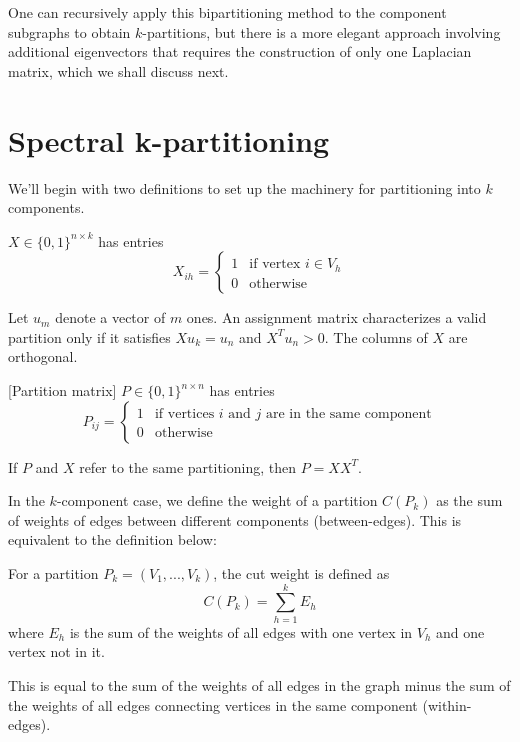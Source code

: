 One can recursively apply this bipartitioning method to the component
subgraphs to obtain $k$-partitions, but there is a more elegant
approach involving additional eigenvectors that requires the
construction of only one Laplacian matrix, which we shall discuss next.

\section{Spectral k-partitioning}

We'll begin with two definitions to set up the machinery for
partitioning into $k$ components.

\begin{definition}
 $X \in \{0, 1\}^{n \times k}$ has entries
\[ X_{ih} = \begin{cases}
		1 & \mbox{if vertex } i \in V_h \\
		0 & \mbox{otherwise}
\end{cases} \]
\end{definition}

Let $u_m$ denote a vector of $m$ ones.
An assignment matrix characterizes a valid partition only if it
satisfies $X u_k = u_n$ and $X^T u_n > 0$.
The columns of $X$ are orthogonal.

\begin{definition} \label{partition_matrix}
[Partition matrix] $P \in \{0, 1\}^{n \times n}$ has entries
\[ P_{ij} = \begin{cases}
		1 & \mbox{if vertices } i \mbox{ and } j
		    \mbox{ are in the same component} \\
		0 & \mbox{otherwise}
\end{cases} \]
\end{definition}

If $P$ and $X$ refer to the same partitioning, then $P = X X^T$.

In the $k$-component case, we define the weight of a partition
$C(P_k)$ as the sum of weights of edges between different components
(between-edges). This is equivalent to the definition below:

\begin{definition}
 For a partition $P_k = (V_1, ..., V_k)$, the cut weight
is defined as
\[ C(P_k) = \sum_{h=1}^k E_h \]
where $E_h$ is the sum of the weights of all edges with one vertex in
$V_h$ and one vertex not in it.
\end{definition}

This is equal to the sum of the weights of all edges in the graph minus
the sum of the weights of all edges connecting vertices in the same
component (within-edges).

